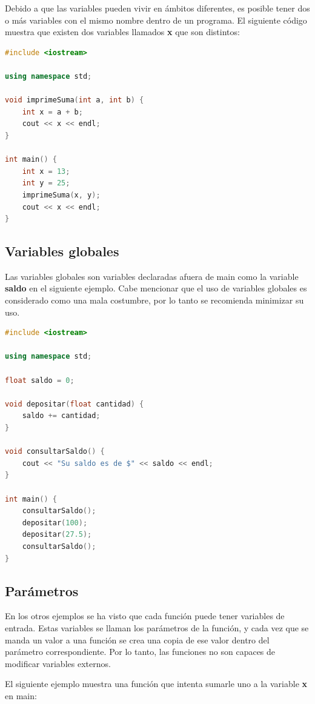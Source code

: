 \documentclass{article}
\begin{document}
Debido a que las variables pueden vivir en ámbitos diferentes, es posible tener dos o más variables con el mismo nombre dentro de un programa. El siguiente código muestra que existen dos variables llamados \textbf{x} que son distintos:

\begin{lstlisting}[language=C++, title=Nombramiento compartido]
#include <iostream>

using namespace std;

void imprimeSuma(int a, int b) {
	int x = a + b;
	cout << x << endl;
}

int main() {
	int x = 13;
	int y = 25;
	imprimeSuma(x, y);
	cout << x << endl;
}
\end{lstlisting}

\subsection{Variables globales}

Las variables globales son variables declaradas afuera de main como la variable \textbf{saldo} en el siguiente ejemplo. Cabe mencionar que el uso de variables globales es considerado como una mala costumbre, por lo tanto se recomienda minimizar su uso.

\begin{lstlisting}[language=C++, title=Variables globales]
#include <iostream>

using namespace std;

float saldo = 0;

void depositar(float cantidad) {
	saldo += cantidad;
}

void consultarSaldo() {
	cout << "Su saldo es de $" << saldo << endl;
}

int main() {
	consultarSaldo();
	depositar(100);
	depositar(27.5);
	consultarSaldo();
}
\end{lstlisting}

\subsection{Parámetros}

En los otros ejemplos se ha visto que cada función puede tener variables de entrada. Estas variables se llaman los parámetros de la función, y cada vez que se manda un valor a una función se crea una copia de ese valor dentro del parámetro correspondiente. Por lo tanto, las funciones no son capaces de modificar variables externos.

El siguiente ejemplo muestra una función que intenta sumarle uno a la variable \textbf{x} en main:
\end{document}
